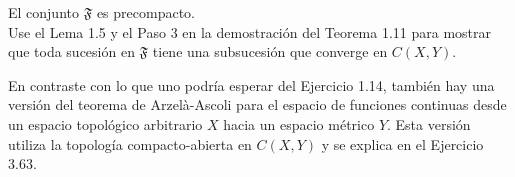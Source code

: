 \begin{exercise}
\begin{itemize}
    \noindent {} El conjunto $\mathfrak{F}$ es precompacto.
    \\ Use el Lema 1.5 y el Paso 3 en la demostración del Teorema 1.11 para mostrar que toda sucesión en $\mathfrak{F}$ tiene una subsucesión que converge en $C(X,Y)$.
\end{itemize}
\end{exercise}

En contraste con lo que uno podría esperar del Ejercicio 1.14, también hay una versión del teorema de Arzelà-Ascoli para el espacio de funciones continuas desde un espacio topológico arbitrario $X$ hacia un espacio métrico $Y$. Esta versión utiliza la topología compacto-abierta en $C(X,Y)$ y se explica en el Ejercicio 3.63.

